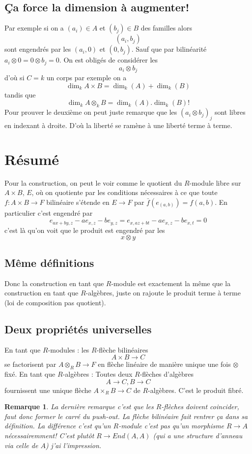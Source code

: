 \documentclass[a4paper,12pt]{article}
\theoremstyle{plain}
\newtheorem{rem}{Remarque}
\theoremstyle{definition}
\theoremstyle{remark}
\begin{document}
\subsection{Ça force la dimension à augmenter!}
Par exemple si on a 
$(a_i)\in A$ et $(b_j)\in B$ des familles alors 
\[(a_i, b_j)\]
sont engendrés par les $(a_i,0)$ et $(0,b_j)$. Sauf que par 
bilinéarité $a_i\otimes 0=0\otimes b_j=0$. On est obligés de
considérer les 
\[a_i\otimes b_j\]
d'où si $C=k$ un corps par exemple on a 
\[\dim_k A\times B=\dim_k (A)+\dim_k(B)\]
tandis que
\[\dim_k A\otimes_k B=\dim_k(A).\dim_k(B)!\]
Pour prouver le deuxième on peut juste remarque que
les $(a_i\otimes b_j)_j$ sont libres en indexant à droite. D'où
la liberté se ramène à une liberté terme à terme.
\section{Résumé}
Pour la construction, on peut le voir comme le quotient du 
$R$-module libre sur $A\times B$, $E$, où on quotiente par les 
conditions nécessaires à ce que toute $f\colon A\times B\to F$
bilinéaire s'étende en $E\to F$ par $\bar f(e_{(a,b)})=f(a,b)$.
En particulier c'est engendré par 
\[e_{ax+by,z}-ae_{x,z}-be_{y,z}=e_{x,az+bt}-ae_{x,z}-be_{x,t}=0\]
c'est là qu'on voit que le produit est engendré par les
\[x\otimes y\]


\subsection{Même définitions}
Donc la construction en tant que $R$-module est exactement
la même que la construction en tant que $R$-algèbres, juste 
on rajoute le produit terme à terme (loi de composition
pas quotient).
\subsection{Deux propriétés universelles}
En tant que $R$-modules : les $R$-flèche bilinéaires
\[A\times B\to C\]
se factorisent par $A\otimes_R B\to F$ en flèche linéaire de 
manière unique une fois $\otimes$ fixé.
En tant que $R$-algèbres : Toutes deux $R$-flèches d'algèbres
\[A\to C, B\to C\]
fournissent une unique flèche $A\times_R B\to C$ de $R$-algèbres.
C'est le produit fibré. 

\begin{rem}
    La dernière remarque c'est que les $R$-flèches doivent
    coincider, faut donc former le carré du push-out. La flèche
    bilinéaire fait rentrer ça dans sa définition. La différence
    c'est qu'un $R$-module c'est pas qu'un morphisme $R\to A$ 
    nécessairemment! C'est plutôt $R\to End(A,A)$ (qui a une
    structure d'anneau via celle de $A$) j'ai
    l'impression.
\end{rem}
\end{document}
